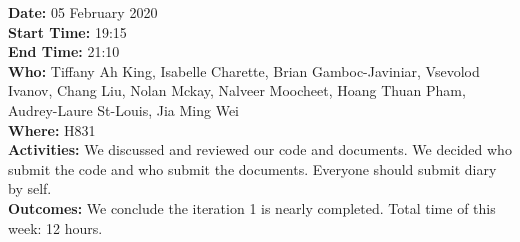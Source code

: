 \documentclass[12pt]{article}
\begin{document}
{\bf Date:} 05 February 2020\\
{\bf Start Time:} 19:15\\
{\bf End Time:}  21:10\\
{\bf Who:} Tiffany Ah King,
Isabelle Charette,
Brian Gamboc-Javiniar,
Vsevolod Ivanov,
Chang Liu,
Nolan Mckay,
Nalveer Moocheet,
Hoang Thuan Pham,
Audrey-Laure St-Louis,
Jia Ming Wei\\
{\bf Where:} H831 \\
{\bf Activities:}  We discussed and reviewed our code and documents. We decided who submit the code and who submit the documents. Everyone should submit diary by self.  \\
{\bf Outcomes:} We conclude the iteration 1 is nearly completed. Total time of this week: 12 hours.\\


\end{document}
